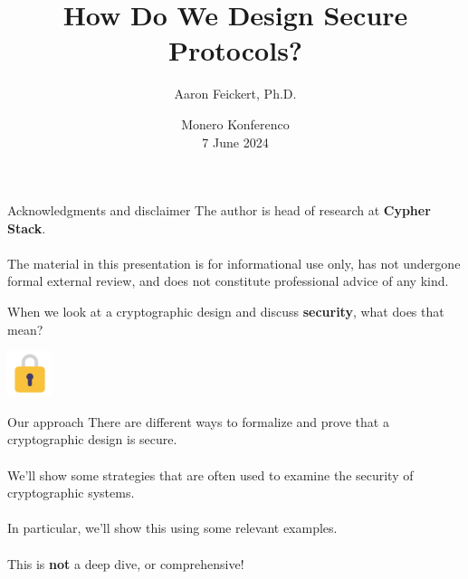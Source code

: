 \documentclass[aspectratio=169]{beamer}
\title{How Do We Design Secure Protocols?}
\author{Aaron Feickert, Ph.D.}
\date{Monero Konferenco \\ 7 June 2024}
\begin{document}
\frame{\titlepage}

\begin{frame}{Acknowledgments and disclaimer}
	The author is head of research at \textbf{Cypher Stack}. \\~\\

	The material in this presentation is for informational use only, has not undergone formal external review, and does not constitute professional advice of any kind.
\end{frame}

\begin{frame}
    When we look at a cryptographic design and discuss \textbf{security}, what does that mean?

    \vspace{30px}

    \begin{center}
        \includegraphics[width=50px]{images/lock.png}
    \end{center}
\end{frame}

\begin{frame}{Our approach}
    There are different ways to formalize and prove that a cryptographic design is secure. \\~\\

    We'll show some strategies that are often used to examine the security of cryptographic systems. \\~\\

    In particular, we'll show this using some relevant examples. \\~\\

    This is \textbf{not} a deep dive, or comprehensive!
\end{frame}
\end{document}
